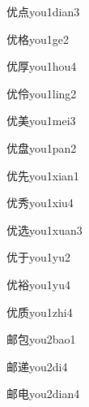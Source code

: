 \begin{verbete}[6;9]{优点}{you1dian3}
\end{verbete}
\begin{verbete}[6;10]{优格}{you1ge2}
\end{verbete}
\begin{verbete}[6;9]{优厚}{you1hou4}
\end{verbete}
\begin{verbete}[6;7]{优伶}{you1ling2}
\end{verbete}
\begin{verbete}[6;9]{优美}{you1mei3}
\end{verbete}
\begin{verbete}[6;11]{优盘}{you1pan2}
\end{verbete}
\begin{verbete}[6;6]{优先}{you1xian1}
\end{verbete}
\begin{verbete}[6;7]{优秀}{you1xiu4}
\end{verbete}
\begin{verbete}[6;9]{优选}{you1xuan3}
\end{verbete}
\begin{verbete}[6;3]{优于}{you1yu2}
\end{verbete}
\begin{verbete}[6;12]{优裕}{you1yu4}
\end{verbete}
\begin{verbete}[6;8]{优质}{you1zhi4}
\end{verbete}
\begin{verbete}[7;5]{邮包}{you2bao1}
\end{verbete}
\begin{verbete}[7;10]{邮递}{you2di4}
\end{verbete}
\begin{verbete*}[7;5]{邮电}{you2dian4}
\end{verbete*}
